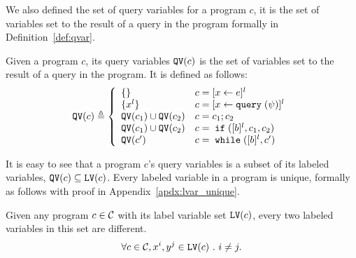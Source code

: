 %
We also defined the set of query variables for a program $c$,
it is the set of variables set to the result of a query in the program formally in Definition~\ref{def:qvar}.
\begin{defn} 
  \label{def:qvar}
Given a program $c$, its query variables 
$\mathtt{QV}(c)$ is the set of variables set to the result of a query in the program.
It is defined as follows:
{\footnotesize
$$
  \qvar(c) \triangleq
  \left\{
  \begin{array}{ll}
      \{\}                  
      & {c} = [{\assign x \expr}]^{l} 
      \\
      \{{x}^l\}                  
      & {c} = [{\assign x \query(\qexpr)}]^{l} 
      \\
      \qvar(c_1) \cup \qvar(c_2)  
      & {c} = {c_1};{c_2}
      \\
      \qvar(c_1) \cup \qvar(c_2) 
      & {c} =\eif([\bexpr]^{l}, c_1, c_2) 
      \\
      \qvar(c')
      & {c}   = \ewhile ([\bexpr]^{l}, {c}')
\end{array}
\right.
$$
}
\end{defn}
%
It is easy to see that a program $c$'s query variables is a subset of 
its labeled variables, $\mathtt{QV}(c) \subseteq \mathtt{LV}(c)$.
%
%
Every labeled variable in a program is unique, formally as follows with proof in Appendix~\ref{apdx:lvar_unique}.
\begin{lem}
  \label{lem:lvar_unique}
  Given any program $c \in \mathcal{C}$ with its label variable set $\mathtt{LV}(c)$,
  every two labeled variables in this set are different.
  \[
    \forall c \in \mathcal{C}, x^i, y^j \in \mathtt{LV}(c) ~.~ i \neq j.
    \]
\end{lem}

